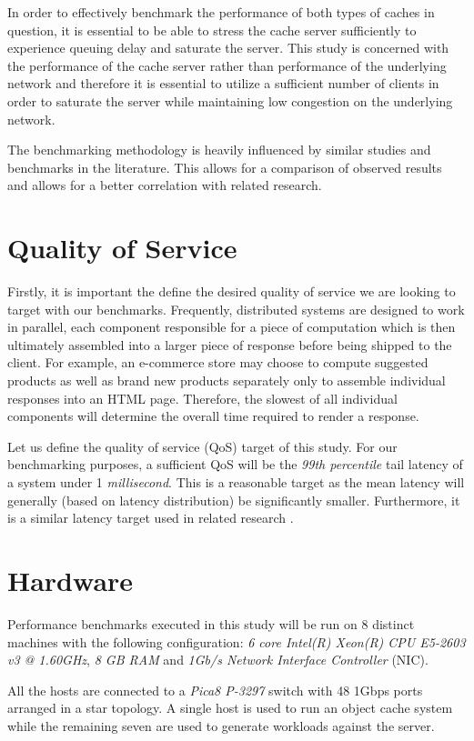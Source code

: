
In order to effectively benchmark the performance of both types of caches in question, it is essential to be able to stress the cache server sufficiently to experience queuing delay and saturate the server. This study is concerned with the performance of the cache server rather than performance of the underlying network and therefore it is essential to utilize a sufficient number of clients in order to saturate the server while maintaining low congestion on the underlying network.

The benchmarking methodology is heavily influenced by similar studies and benchmarks in the literature. This allows for a comparison of observed results and allows for a better correlation with related research.


\section{Quality of Service}
Firstly, it is important the define the desired quality of service we are looking to target with our benchmarks. Frequently, distributed systems are designed to work in parallel, each component responsible for a piece of computation which is then ultimately assembled into a larger piece of response before being shipped to the client. For example, an e-commerce store may choose to compute suggested products as well as brand new products separately only to assemble individual responses into an HTML page. Therefore, the slowest of all individual components will determine the overall time required to render a response.

Let us define the quality of service (QoS) target of this study. For our benchmarking purposes, a sufficient QoS will be the \textit{99th percentile} tail latency of a system under 1 \textit{millisecond}. This is a reasonable target as the mean latency will generally (based on latency distribution) be significantly smaller. Furthermore, it is a similar latency target used in related research \cite{leverich2014reconciling}.

\section{Hardware}
Performance benchmarks executed in this study will be run on 8 distinct machines with the following configuration: \textit{6 core Intel(R) Xeon(R) CPU E5-2603 v3 @ 1.60GHz}, \textit{8 GB RAM} and \textit{1Gb/s Network Interface Controller} (NIC).

All the hosts are connected to a \textit{Pica8 P-3297} switch with 48 1Gbps ports arranged in a star topology. A single host is used to run an object cache system while the remaining seven are used to generate workloads against the server.

